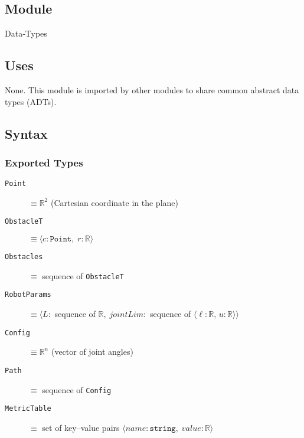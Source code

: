 \documentclass[12pt, titlepage]{article}
\begin{document}
\subsection{Module}
Data‑Types

\subsection{Uses}
None.  This module is imported by other modules to share common
abstract data types (ADTs).

\subsection{Syntax}
\subsubsection{Exported Types}
\begin{description}
  \item[\texttt{Point}] $\equiv \mathbb{R}^2$
        \hfill (Cartesian coordinate in the plane)
  \item[\texttt{ObstacleT}]
        $\equiv \langle c : \texttt{Point},\; r : \mathbb{R} \rangle$
  \item[\texttt{Obstacles}]
        $\equiv$ sequence of \texttt{ObstacleT}

  \item[\texttt{RobotParams}]
        $\equiv \langle
          L :$ sequence of $\mathbb{R},\;
          \textit{jointLim} :$ sequence of
          $\langle \ell : \mathbb{R},\, u : \mathbb{R}\rangle
        \rangle$

  \item[\texttt{Config}] $\equiv \mathbb{R}^n$
        \hfill (vector of joint angles)
  \item[\texttt{Path}] $\equiv$ sequence of \texttt{Config}

  \item[\texttt{MetricTable}]
        $\equiv$ set of key–value pairs
        $\langle \textit{name} : \texttt{string},\;
                 \textit{value} : \mathbb{R} \rangle$
\end{description}
\end{document}
